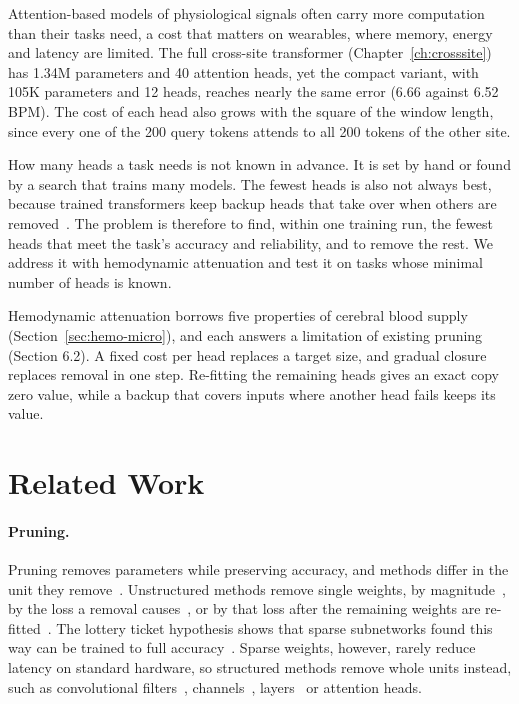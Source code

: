Attention-based models of physiological signals often carry more computation than their tasks need, a cost that matters on wearables, where memory, energy and latency are limited. The full cross-site transformer (Chapter~\ref{ch:crosssite}) has 1.34M parameters and 40 attention heads, yet the compact variant, with 105K parameters and 12 heads, reaches nearly the same error (6.66 against 6.52 BPM). The cost of each head also grows with the square of the window length, since every one of the 200 query tokens attends to all 200 tokens of the other site.

How many heads a task needs is not known in advance. It is set by hand or found by a search that trains many models. The fewest heads is also not always best, because trained transformers keep backup heads that take over when others are removed~\citep{wang2023interpretability,mcgrath2023hydra}. The problem is therefore to find, within one training run, the fewest heads that meet the task's accuracy and reliability, and to remove the rest. We address it with hemodynamic attenuation and test it on tasks whose minimal number of heads is known.

Hemodynamic attenuation borrows five properties of cerebral blood supply (Section~\ref{sec:hemo-micro}), and each answers a limitation of existing pruning (Section 6.2). A fixed cost per head replaces a target size, and gradual closure replaces removal in one step. Re-fitting the remaining heads gives an exact copy zero value, while a backup that covers inputs where another head fails keeps its value.

\section{Related Work}
\label{sec:pruning}

\paragraph{Pruning.}
Pruning removes parameters while preserving accuracy, and methods differ in the unit they remove~\citep{hoefler2021sparsity}. Unstructured methods remove single weights, by magnitude~\citep{han2015learning}, by the loss a removal causes~\citep{obd}, or by that loss after the remaining weights are re-fitted~\citep{obs}. The lottery ticket hypothesis shows that sparse subnetworks found this way can be trained to full accuracy~\citep{frankle2019lottery}. Sparse weights, however, rarely reduce latency on standard hardware, so structured methods remove whole units instead, such as convolutional filters~\citep{li2017pruning}, channels~\citep{liu2017learning}, layers~\citep{fan2020reducing} or attention heads.

